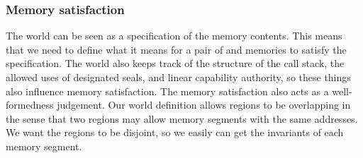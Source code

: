 \begin{jversion}
\subsubsection{Memory satisfaction}
\label{subsubsec:mem-sat}
The world can be seen as a specification of the memory contents.
This means that we need to define what it means for a pair of \trgcm{} and \srccm{} memories to satisfy the specification.
The world also keeps track of the structure of the call stack, the allowed uses of designated seals, and linear capability authority, so these things also influence memory satisfaction.
The memory satisfaction also acts as a well-formedness judgement.
Our world definition allows regions to be overlapping in the sense that two regions may allow memory segments with the same addresses.
We want the regions to be disjoint, so we easily can get the invariants of each memory segment.


\end{jversion}
